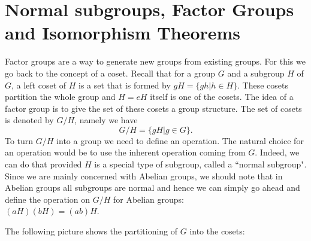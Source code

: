 \documentclass[12pt]{article}
\theoremstyle{plain}
\theoremstyle{definition}
\theoremstyle{remark}
\begin{document}
\section{Normal subgroups, Factor Groups and Isomorphism Theorems}
Factor groups are a way to generate new groups from existing groups. For this we go back to the concept of a coset. Recall that for a group $G$ and a subgroup $H$ of $G$, a left coset of $H$ is a set that is formed by $gH = \{gh|h\in H\}$. These cosets partition the whole group and $H = eH$ itself is one of the cosets. The idea of a factor group is to give the set of these cosets a group structure. The set of cosets is denoted by $G/H$, namely we have
$$G/H = \{gH|g\in G\}.$$
To turn $G/H$ into a group we need to define an operation. The natural choice for an operation would be to use the inherent operation coming from $G$. Indeed, we can do that provided $H$ is a special type of subgroup, called a ``normal subgroup". Since we are mainly concerned with Abelian groups, we should note that in Abelian groups all subgroups are normal and hence we can simply go ahead and define the operation on $G/H$ for Abelian groups:
\\
$(aH)(bH) = (ab)H$.

The following picture shows the partitioning of $G$ into the cosets:

\bigskip

\end{document}
